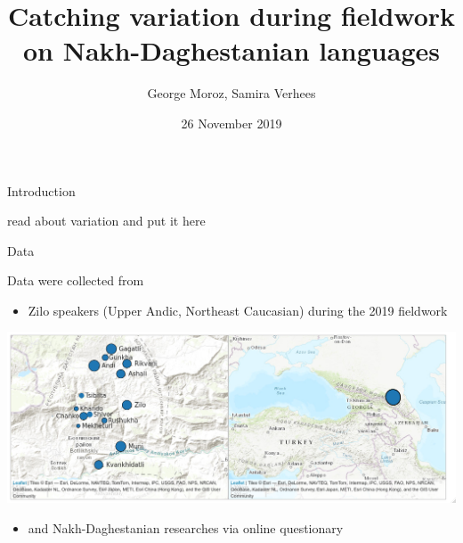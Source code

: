 \documentclass[
  ignorenonframetext,
]{beamer}
\title{Catching variation during fieldwork on Nakh-Daghestanian languages}
\author{George Moroz, Samira Verhees}
\date{26 November 2019}
\institute{Linguistic Convergence Laboratory, NRU HSE}
\providecommand{\tightlist}{%
  \setlength{\itemsep}{0pt}\setlength{\parskip}{0pt}}
\begin{document}
\frame{\titlepage}

\begin{frame}{Introduction}
\protect\hypertarget{introduction}{}

read about variation and put it here

\end{frame}

\begin{frame}{Data}
\protect\hypertarget{data}{}

Data were collected from

\begin{itemize}
\tightlist
\item
  Zilo speakers (Upper Andic, Northeast Caucasian) during the 2019
  fieldwork
\end{itemize}

\includegraphics{images/01_map.png}

\begin{itemize}
\tightlist
\item
  and Nakh-Daghestanian researches via online questionary
\end{itemize}

\end{frame}
\end{document}
